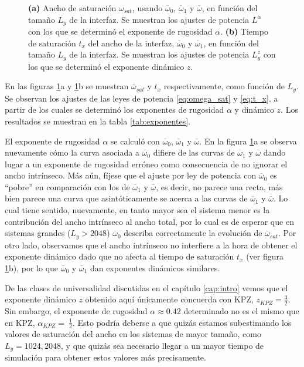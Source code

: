 \begin{figure}[!h]
\begin{subfigure}{.57\textwidth}
      \caption{}
    \end{subfigure}
    \caption[Ancho de saturación $\omega_{sat}$ y tiempo de saturación $t_x$ de la interfaz de infectados para diferentes $L_y$ ]{\textbf{(a)} Ancho de saturación $\omega_{sat}$, usando $\overline{\omega}_0$, $\overline{\omega}_1$ y $\overline{\omega}$, en función del tamaño $L_y$ de la interfaz. Se muestran los ajustes de potencia $L^\alpha$ con los que se determinó el exponente de rugosidad $\alpha$. \textbf{(b)} Tiempo de saturación $t_x$ del ancho de la interfaz, $\overline{\omega}_0$ y $\overline{\omega}_1$, en función del tamaño $L_y$ de la interfaz. Se muestran los ajustes de potencia $L_y^z$ con los que se determinó el exponente dinámico $z$.}
    \label{fig:omega_txvsL}
\end{figure}

En las figuras \ref{fig:omega_txvsL}a y \ref{fig:omega_txvsL}b se muestran $\overline{\omega}_{sat}$ y $t_x$ respectivamente, como función de $L_y$. Se observan los ajustes de las leyes de potencia \ref{eq:omega_sat} y \ref{eq:t_x}, a partir de los cuales se determinó los exponentes de rugosidad $\alpha$ y dinámico $z$. Los resultados se muestran en la tabla \ref{tab:exponentes}. 

El exponente de rugosidad $\alpha$ se calculó con $\overline{\omega}_0$, $\overline{\omega}_1$ y $\overline{\omega}$. En la figura \ref{fig:omega_txvsL}a se observa nuevamente cómo la curva asociada a $\overline{\omega}_0$ difiere de las curvas de $\overline{\omega}_1$ y $\overline{\omega}$ dando lugar a un exponente de rugosidad erróneo como consecuencia de no ignorar el ancho intrínseco. Más aún, fíjese que el ajuste por ley de potencia con $\overline{\omega}_0$ es ``pobre'' en comparación con los de $\overline{\omega}_1$ y $\overline{\omega}$, es decir, no parece una recta, más bien parece una curva que asintóticamente se acerca a las curvas de $\overline{\omega}_1$ y $\overline{\omega}$. Lo cual tiene sentido, nuevamente, en tanto mayor sea el sistema menor es la contribución del ancho intrínseco al ancho total, por lo cual es de esperar que en sistemas grandes ($L_y > 2048$) $\overline{\omega}_0$ describa correctamente la evolución de $\overline{\omega}_{sat}$. Por otro lado, observamos que el ancho intrínseco no interfiere a la hora de obtener el exponente dinámico dado que no afecta al tiempo de saturación $t_x$ (ver figura \ref{fig:omega_txvsL}b), por lo que $\overline{\omega}_0$ y $\overline{\omega}_1$ dan exponentes dinámicos similares.

De las clases de universalidad discutidas en el capítulo \ref{cap:intro} vemos que el exponente dinámico $z$ obtenido aquí únicamente concuerda con KPZ, $z_{KPZ} = \frac{3}{2}$. Sin embargo, el exponente de rugosidad $\alpha\approx 0.42$ determinado no es el mismo que en KPZ, $\alpha_{KPZ} = ~\frac{1}{2}$. Esto podría deberse a que quizás estamos subestimando los valores de saturación del ancho en los sistemas de mayor tamaño, como $L_y = 1024,2048$, y que quizás sea necesario llegar a un mayor tiempo de simulación para obtener estos valores más precisamente.

